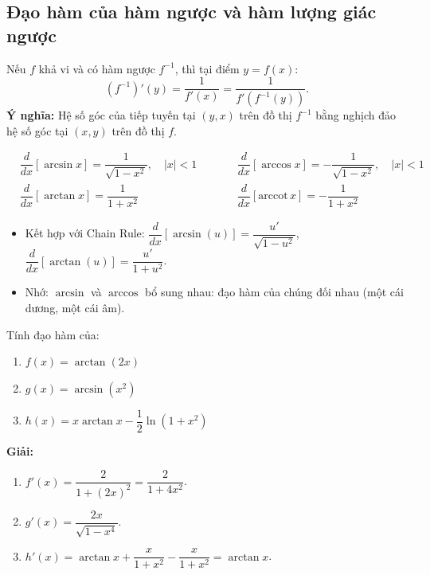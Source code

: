 \documentclass[12pt,a4paper]{article}
\begin{document}
\subsection{Đạo hàm của hàm ngược và hàm lượng giác ngược}

\begin{dinhly}[title={Đạo hàm hàm ngược}]
  Nếu $f$ khả vi và có hàm ngược $f^{-1}$, thì tại điểm $y = f(x)$:
  \[
    (f^{-1})'(y) = \dfrac{1}{f'(x)} = \dfrac{1}{f'(f^{-1}(y))}.
  \]
  \textbf{Ý nghĩa:} Hệ số góc của tiếp tuyến tại $(y, x)$ trên đồ thị $f^{-1}$ bằng nghịch đảo hệ số góc tại $(x, y)$ trên đồ thị $f$.
\end{dinhly}

\begin{congthuc}[title={Đạo hàm hàm lượng giác ngược}]
  \begin{align*}
    &\dfrac{d}{dx}[\arcsin x] = \dfrac{1}{\sqrt{1 - x^2}}, \quad |x| < 1
    &\qquad&
    \dfrac{d}{dx}[\arccos x] = -\dfrac{1}{\sqrt{1 - x^2}}, \quad |x| < 1 \\[6pt]
    &\dfrac{d}{dx}[\arctan x] = \dfrac{1}{1 + x^2}
    &&
    \dfrac{d}{dx}[\text{arccot}\, x] = -\dfrac{1}{1 + x^2}
  \end{align*}
\end{congthuc}

\begin{luuy}
  \begin{itemize}
    \item Kết hợp với Chain Rule: $\dfrac{d}{dx}[\arcsin(u)] = \dfrac{u'}{\sqrt{1-u^2}}$, $\dfrac{d}{dx}[\arctan(u)] = \dfrac{u'}{1+u^2}$.
    \item Nhớ: $\arcsin$ và $\arccos$ bổ sung nhau: đạo hàm của chúng đối nhau (một cái dương, một cái âm).
  \end{itemize}
\end{luuy}

\begin{vidu}
  Tính đạo hàm của:
  \begin{enumerate}[label=(\alph*)]
    \item $f(x) = \arctan(2x)$
    \item $g(x) = \arcsin(x^2)$
    \item $h(x) = x \arctan x - \dfrac{1}{2}\ln(1 + x^2)$
  \end{enumerate}

  \medskip\textbf{Giải:}
  \begin{enumerate}[label=(\alph*)]
    \item $f'(x) = \dfrac{2}{1 + (2x)^2} = \dfrac{2}{1 + 4x^2}$.
    \item $g'(x) = \dfrac{2x}{\sqrt{1 - x^4}}$.
    \item $h'(x) = \arctan x + \dfrac{x}{1+x^2} - \dfrac{x}{1+x^2} = \arctan x$.
  \end{enumerate}
\end{vidu}
\end{document}
